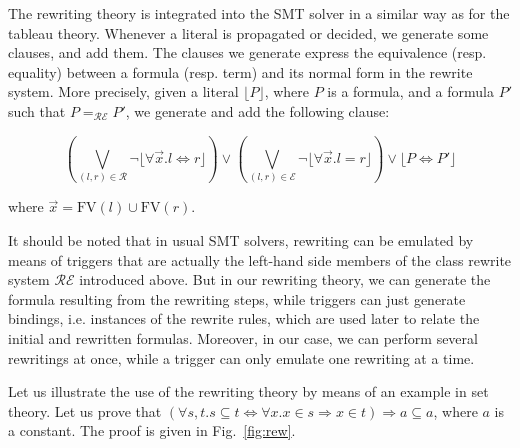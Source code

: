 The rewriting theory is integrated into the SMT solver in a similar way as for
the tableau theory. Whenever a literal is propagated or decided, we generate some clauses,
and add them. The clauses we generate
express the equivalence (resp. equality) between a formula (resp. term) and its normal form
in the rewrite system. More precisely, given a literal
$\lfloor{}P\rfloor$, where $P$ is a formula, and a formula $P'$ such that
$P=_\mathcal{RE}P'$, we generate and add the following clause:

$$\left(\bigvee_{(l,r)\in\mathcal{R}}
\neg\lfloor\forall{}\vec{x}.l\Leftrightarrow{}r\rfloor\right)\lor
\left(\bigvee_{(l,r)\in\mathcal{E}}\neg\lfloor\forall{}\vec{x}.l=r\rfloor\right)\lor
\lfloor{}P\Leftrightarrow{}P'\rfloor$$

where $\vec{x}=\mathrm{FV}(l)\cup\mathrm{FV}(r)$.

It should be noted that in usual SMT solvers, rewriting can be emulated by means
of triggers that are actually the left-hand side members of the class rewrite
system $\mathcal{RE}$ introduced above. But in our rewriting theory, we can
generate the formula resulting from the rewriting steps, while triggers can just
generate bindings, i.e. instances of the rewrite rules, which are used later to
relate the initial and rewritten formulas. Moreover, in our case, we can perform
several rewritings at once, while a trigger can only emulate one rewriting at a
time.

Let us illustrate the use of the rewriting theory by means of an example in set
theory. Let us prove that
$(\forall{}s,t.s\subseteq{}t\Leftrightarrow{}\forall{}x.x\in{}s\Rightarrow{}
x\in{}t) \Rightarrow{} {}a\subseteq{}a$, where $a$ is a constant. The proof is
given in Fig.~\ref{fig:rew}.


